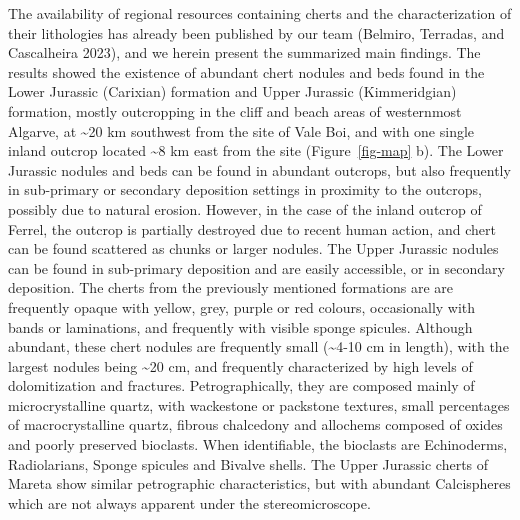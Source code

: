 \documentclass[
  a4paper,
  DIV=11,
  numbers=noendperiod]{scrreprt}
\begin{document}
The availability of regional resources containing cherts and the
characterization of their lithologies has already been published by our
team (Belmiro, Terradas, and Cascalheira 2023), and we herein present
the summarized main findings. The results showed the existence of
abundant chert nodules and beds found in the Lower Jurassic (Carixian)
formation and Upper Jurassic (Kimmeridgian) formation, mostly
outcropping in the cliff and beach areas of westernmost Algarve, at
\textasciitilde20 km southwest from the site of Vale Boi, and with one
single inland outcrop located \textasciitilde8 km east from the site
(Figure~\ref{fig-map} b). The Lower Jurassic nodules and beds can be
found in abundant outcrops, but also frequently in sub-primary or
secondary deposition settings in proximity to the outcrops, possibly due
to natural erosion. However, in the case of the inland outcrop of
Ferrel, the outcrop is partially destroyed due to recent human action,
and chert can be found scattered as chunks or larger nodules. The Upper
Jurassic nodules can be found in sub-primary deposition and are easily
accessible, or in secondary deposition. The cherts from the previously
mentioned formations are are frequently opaque with yellow, grey, purple
or red colours, occasionally with bands or laminations, and frequently
with visible sponge spicules. Although abundant, these chert nodules are
frequently small (\textasciitilde4-10 cm in length), with the largest
nodules being \textasciitilde20 cm, and frequently characterized by high
levels of dolomitization and fractures. Petrographically, they are
composed mainly of microcrystalline quartz, with wackestone or packstone
textures, small percentages of macrocrystalline quartz, fibrous
chalcedony and allochems composed of oxides and poorly preserved
bioclasts. When identifiable, the bioclasts are Echinoderms,
Radiolarians, Sponge spicules and Bivalve shells. The Upper Jurassic
cherts of Mareta show similar petrographic characteristics, but with
abundant Calcispheres which are not always apparent under the
stereomicroscope.
\end{document}
